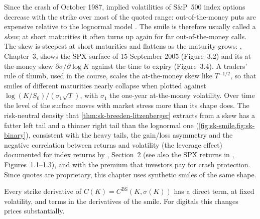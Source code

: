 \begin{remark}\label{rem:sk-smile-data}
Since the crash of October 1987, implied volatilities of S\&P~500 index options decrease with the
strike over most of the quoted range: out-of-the-money puts are expensive relative to the lognormal
model \citep{rubinstein-1994}. The smile is therefore usually called a \emph{skew}; at short
maturities it often turns up again for far out-of-the-money calls. The skew is steepest at short
maturities and flattens as the maturity grows: \textcite{gatheral-volatility-surface}, Chapter~3,
shows the SPX surface of 15 September 2005 (Figure~3.2) and its at-the-money skew
$\partial\sigma/\partial\log K$ against the time to expiry (Figure~3.4). A traders' rule of thumb, used in
the course, scales the at-the-money skew like $T^{-1/2}$, so that smiles of different maturities nearly
collapse when plotted against $\log(K/S_0)/(\sigma_1\sqrt T)$, with $\sigma_1$ the one-year at-the-money
volatility. Over time the level of the surface moves with market stress more than its shape does.
The risk-neutral density that
\cref{thm:sk-breeden-litzenberger} extracts from a skew has a fatter left tail and a thinner right tail
than the lognormal one (\cref{fig:sk-smile,fig:sk-binary}), consistent with the heavy tails, the
gain/loss asymmetry and the negative correlation between returns and volatility (the leverage effect)
documented for index returns by \textcite{cont-stylized}, Section~2 (see also the SPX returns in
\textcite{gatheral-volatility-surface}, Figures~1.1--1.3), and with the premium that investors pay for
crash protection. Since quotes are proprietary, this chapter uses synthetic smiles of the same shape.
\end{remark}

Every strike derivative of $C(K)=C^{\mathrm{BS}}(K,\sigma(K))$ has a direct term, at fixed volatility, and
terms in the derivatives of the smile. For digitals this changes prices substantially.

